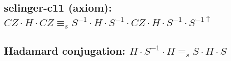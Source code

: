 \documentclass[a4paper]{article}
\begin{document}
\subsection*{selinger-c11 (axiom): $CZ \cdot H \cdot CZ \equiv_s S^{-1} \cdot H \cdot S^{-1} \cdot CZ \cdot H \cdot S^{-1} \cdot S^{-1\uparrow}$}


\subsection*{Hadamard conjugation: $H \cdot S^{-1} \cdot H \equiv_s S \cdot H \cdot S$}

\end{document}

